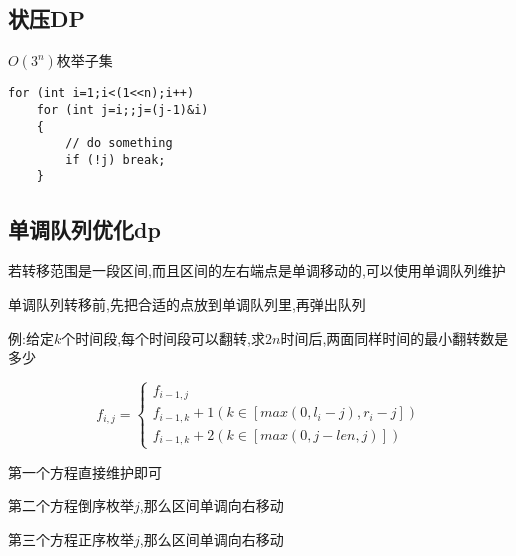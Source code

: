 \documentclass[a4paper]{ctexart}
\begin{document}
\subsection{状压DP}

$O(3^n)$枚举子集

\begin{lstlisting}
for (int i=1;i<(1<<n);i++)
    for (int j=i;;j=(j-1)&i)
    {
        // do something
        if (!j) break;
    }
\end{lstlisting}

\subsection{单调队列优化dp}
若转移范围是一段区间,而且区间的左右端点是单调移动的,可以使用单调队列维护

单调队列转移前,先把合适的点放到单调队列里,再弹出队列

例:给定$k$个时间段,每个时间段可以翻转,求$2n$时间后,两面同样时间的最小翻转数是多少

\begin{equation}  
f_{i,j}=\left\{  
        \begin{array}{lr}
        f_{i-1,j}\\
        f_{i-1,k}+1(k\in[max(0,l_i-j),r_i-j])\\
        f_{i-1,k}+2(k\in[max(0,j-len,j)])
        \end{array}  
\right.  
\end{equation} 

第一个方程直接维护即可

第二个方程倒序枚举$j$,那么区间单调向右移动

第三个方程正序枚举$j$,那么区间单调向右移动
\end{document}
